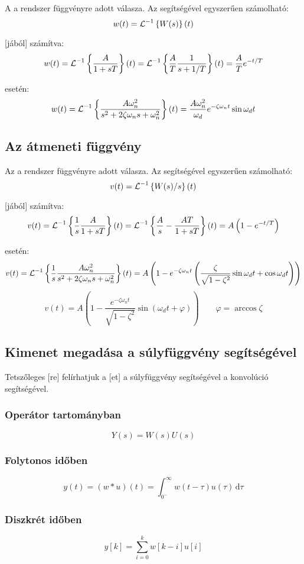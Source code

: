 \documentclass[../main.tex]{subfiles}
\begin{document}
A  a rendszer  függvényre adott válasza.
Az  segítségével egyszerűen számolható:
\[
  w(t) = \operatorname{\mathcal{L}}^{-1} \left\{ W(s) \right\}(t)
\]

 [jából] számítva:
\[
  w(t)
  = \operatorname{\mathcal{L}}^{-1} \left\{ \frac{A}{1 + sT} \right\} (t)
  = \operatorname{\mathcal{L}}^{-1} \left\{ \frac{A}{T} \frac{1}{s + 1/T} \right\} (t)
  = \frac{A}{T} e^{-t / T}
\]

 esetén:
\[
  w(t)
  = \operatorname{\mathcal{L}}^{-1} \left\{ \frac{A \omega_n^2}{s^2 + 2 \zeta \omega_n  s + \omega_n^2} \right\} (t)
  = \frac{A \omega_n^2}{\omega_d} e^{-\zeta \omega_n t } \sin \omega_d t
\]

\subsection{Az átmeneti függvény}

Az  a rendszer  függvényre adott válasza.
Az  segítségével egyszerűen számolható:
\[
  v(t) = \operatorname{\mathcal{L}}^{-1} \left\{ W(s) / s\right\}(t)
\]

 [jából] számítva:
\[
  v(t)
  = \operatorname{\mathcal{L}}^{-1} \left\{ \frac{1}{s} \frac{A}{1 + sT} \right\} (t)
  = \operatorname{\mathcal{L}}^{-1} \left\{ \frac{A}{s} -  \frac{AT}{1 + sT} \right\} (t)
  = A \left( 1 - e^{-t/T} \right)
\]

 esetén:
\[
  v(t)
  = \operatorname{\mathcal{L}}^{-1} \left\{ \frac{1}{s} \frac{A \omega_n^2}{s^2 + 2 \zeta \omega_n	s + \omega_n^2} \right\} (t)
  = A \left( 1 - e^{-\zeta \omega_n t} \left( \frac{\zeta}{\sqrt{1 - \zeta^2}} \sin \omega_d t + \cos \omega_d t
  \right) \right)
\]\[
  v(t) = A \left( 1 - \frac{e^{-\zeta \omega_n t}}{\sqrt{1 - \zeta^2}} \sin \left( \omega_d t + \varphi \right)
  \right)
  \qquad
  \varphi = \arccos \zeta
\]

\subsection{Kimenet megadása a súlyfüggvény segítségével}

Tetszőleges [re] felírhatjuk a [et] a súlyfüggvény
segítségével a konvolúció segítségével.

\subsubsection*{Operátor tartományban}
\[
  Y(s) = W(s)U(s)
\]

\subsubsection*{Folytonos időben}
\[
  y(t) = (w * u)(t) = \int_{0^-}^\infty w(t - \tau) u(\tau) \, \mathrm{d} \tau
\]

\subsubsection*{Diszkrét időben}
\[
  y[k] = \sum_{i=0}^k w [k - i] u[i]
\]
\end{document}
